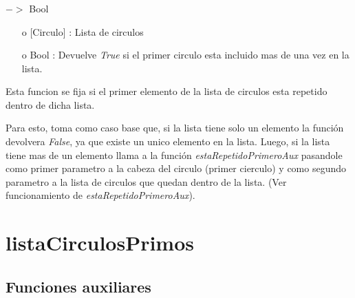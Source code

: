 \documentclass[10pt,journal]{IEEEtran}
\begin{document}
\subsubsection{\color{Red}{estaRepetidoPrimero}}
\begin{description}[style=nextline]
        \item[\color{Green}{Signatura}] [Circulo] $->$ Bool 
        \begin{itemize}
        \item [o]  [Circulo] : Lista de circulos
        \item [o]  Bool : Devuelve \textit{True} si el primer circulo esta incluido mas de una vez en la lista.
        \end{itemize}        
        
        \item[\color{Green}{Descripción}] Esta funcion se fija si el primer elemento de la lista de circulos esta repetido dentro de dicha lista.
        
        Para esto, toma como caso base que, si la lista tiene solo un elemento la función devolvera \textit{False}, ya que existe un unico elemento en la lista. Luego, si la lista tiene mas de un elemento llama a la función \textit{estaRepetidoPrimeroAux} pasandole como primer parametro a la cabeza del circulo (primer cierculo) y como segundo parametro a la lista de circulos que quedan dentro de la lista. (Ver funcionamiento de \textit{estaRepetidoPrimeroAux}).
\end{description}


\section{listaCirculosPrimos}
\subsection{Funciones auxiliares}
\end{document}
